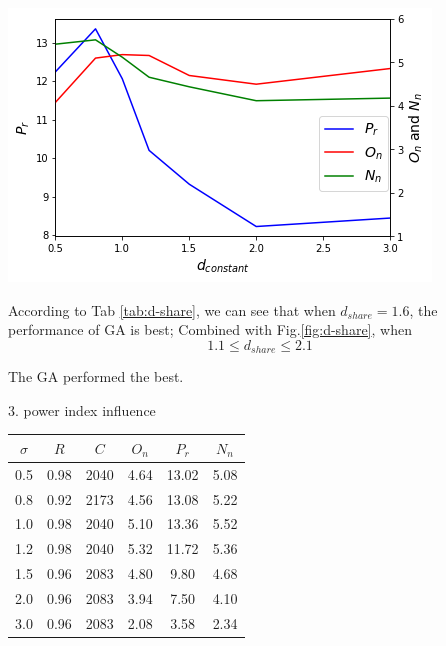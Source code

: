 \documentclass[smallextended]{svjour3}       %
\begin{document}
\begin{multicols}{2}
\begin{center}
  \includegraphics[width=\linewidth]{GA_images/d_constant.png}
  \label{fig:d-share}
\end{center}

According to Tab \ref{tab:d-share},  we can see that when $d_{share}=1.6$,
the performance of GA is best; Combined with Fig.\ref{fig:d-share}, when 
$$1.1 \leq d_{share} \leq 2.1$$

The GA performed the best.


3. power index influence

\begin{tabular}{cccccc}
	\toprule
    $\sigma$ & $R$ & $C$ & $O_{n}$ & $P_{r}$ & $N_{n}$\\
	\midrule
    0.5 & 0.98 & 2040 & 4.64 & 13.02 & 5.08 \\
    0.8 & 0.92 & 2173 & 4.56 & 13.08 & 5.22 \\
    1.0 & 0.98 & 2040 & 5.10 & 13.36 & 5.52 \\
    1.2 & 0.98 & 2040 & 5.32 & 11.72 & 5.36 \\
    1.5 & 0.96 & 2083 & 4.80 & 9.80 & 4.68 \\
    2.0 & 0.96 & 2083 & 3.94 & 7.50 & 4.10 \\
    3.0 & 0.96 & 2083 & 2.08 & 3.58 & 2.34 \\
	\bottomrule
\end{tabular}


\end{multicols}
\end{document}
